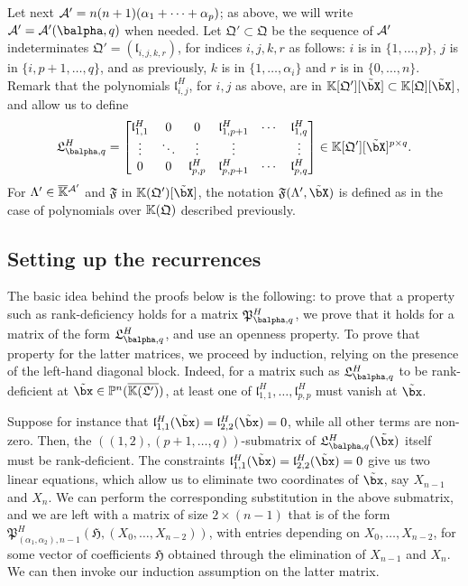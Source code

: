 \documentclass[12pt]{article}
\begin{document}
Let next ${\cal A}'=n(n+1)(\alpha_1+\cdots+\alpha_p)$; as above, 
we will write ${\cal A}'={\cal A}'(\balpha,q)$ when needed. Let
$\mathfrak{Q}'\subset \mathfrak{Q}$ be the sequence of ${\cal A}'$
indeterminates $\mathfrak{Q}'=(\mathfrak{l}_{i,j,k,r})$, for indices
$i,j,k,r$ as follows: $i$ is in $\{1,\dots,p\}$, $j$ is in
$\{i,p+1,\dots,q\}$, and as previously, $k$ is in
$\{1,\dots,\alpha_i\}$ and $r$ is in $\{0,\dots,n\}$. Remark that the
polynomials $\mathfrak{l}^H_{i,j}$, for $i,j$ as above, are in
$\KK[\mathfrak{Q}'][\tilde\bX] \subset \KK[\mathfrak{Q}][\tilde \bX]$,
and allow us to define
\begin{align}\label{eq:matMprime}
\mathfrak{L}^H_{\balpha,q}=\left [\begin{matrix} \mathfrak{l}^H_{1,1} & 0 & 0
    &\mathfrak{l}^H_{1,p+1} & \cdots & \mathfrak{l}^H_{1,q}\\ \vdots & \ddots &
    \vdots & \vdots & & \vdots\\ 0&0& \mathfrak{l}^H_{p,p}
    &\mathfrak{l}^H_{p,p+1} & \cdots & \mathfrak{l}^H_{p,q}
  \end{matrix}\right ]\in \KK[\mathfrak{Q}'][\tilde\bX]^{p\times q}.
\end{align}
For $\Lambda' \in \overline{\mathbb{K}}{}^{{\cal A}'}$ and $\mathfrak{F}$ in 
$\KK(\mathfrak{Q}')[\tilde\bX]$, the notation
$\mathfrak{F}(\Lambda',\tilde\bX)$ is defined as in the case of
polynomials over $\mathbb{K}(\mathfrak{Q})$ described previously.


\subsection{Setting up the recurrences}
The basic idea behind the proofs below is the following: to prove that
a property such as rank-deficiency holds for a matrix
$\mathfrak{P}^H_{\balpha,q}$, we prove that it holds for a matrix of
the form $\mathfrak{L}^H_{\balpha,q}$, and use an openness
property. To prove that property for the latter matrices, we proceed
by induction, relying on the presence of the left-hand diagonal
block. Indeed, for a matrix such as $\mathfrak{L}^H_{\balpha,q}$ to be
rank-deficient at $\tilde\bx \in \P^n(\KKGpbar)$, at least one of
$\mathfrak{l}^H_{1,1},\dots,\mathfrak{l}^H_{p,p}$ must vanish at
$\tilde\bx$.

Suppose for instance that
$\mathfrak{l}^H_{1,1}(\tilde\bx)=\mathfrak{l}^H_{2,2}(\tilde\bx)=0$,
while all other terms are non-zero. Then, the
$((1,2),(p+1,\dots,q))$-submatrix of
${\mathfrak{L}^H_{\balpha,q}}(\tilde\bx)$ itself must be
rank-deficient.  The constraints
$\mathfrak{l}^H_{1,1}(\tilde\bx)=\mathfrak{l}^H_{2,2}(\tilde\bx)=0$
give us two linear equations, which allow us to eliminate two
coordinates of $\tilde\bx$, say $X_{n-1}$ and $X_n$. We can perform
the corresponding substitution in the above submatrix, and we are left
with a matrix of size $2 \times (n-1)$ that is of the form
$\mathfrak{P}^H_{(\alpha_1,\alpha_2),n-1}(\mathfrak{H},(X_0,\dots,X_{n-2}))$,
with entries depending on $X_0,\dots,X_{n-2}$, for some vector of
coefficients $\mathfrak{H}$ obtained through the elimination of
$X_{n-1}$ and $X_n$. We can then invoke our induction assumption on
the latter matrix.
\end{document}
